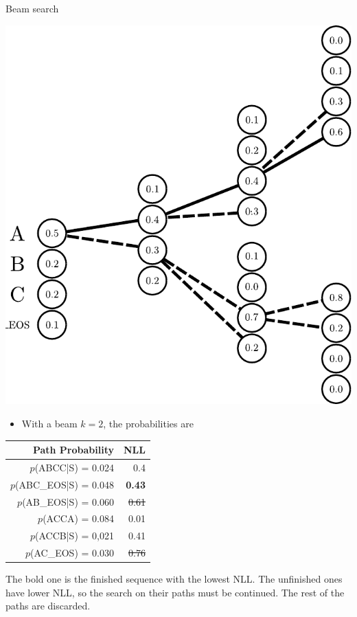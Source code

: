 \documentclass{beamer}
\begin{document}
\begin{frame}{Beam search}
\vspace{-1cm}
\begin{multicols}{2}

\includegraphics[scale=0.5]{Module 5 (RNN)/pics/beam_search.pdf}

\columnbreak

\begin{itemize}
\item With a beam $k=2$, the probabilities are
\end{itemize}
\begin{table}
    \centering
    \begin{tabular}{r|r}
 Path   Probability & NLL\\
 \hline
         $p$(ABCC|S) = 0.024 &0.4 \\
         $p$(ABC\_EOS|S) =  0.048 &\textbf{0.43}\\
         $p$(AB\_EOS|S) =   0.060 &\sout{0.61}\\
         $p$(ACCA) =   0.084 &0.01\\
         $p$(ACCB|S) = 0,021& 0.41\\
         $p$(AC\_EOS) =  0.030& \sout{0.76}\\
    \end{tabular}
\end{table}
\end{multicols}
The bold one is the finished sequence with the lowest NLL. The unfinished ones have lower NLL, so the search on their paths must be continued. The rest of the paths are discarded.
\end{frame}
\end{document}
